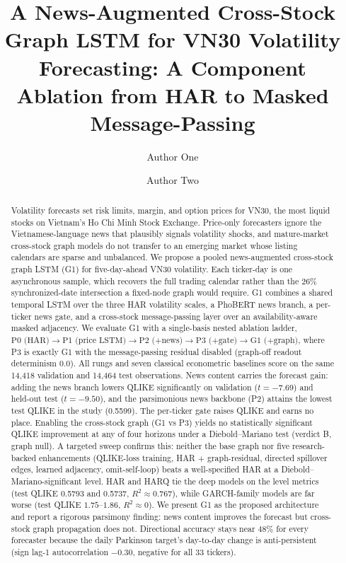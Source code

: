 \documentclass[runningheads]{llncs}
\newcommand{\PtwoTestQ}{0.5599}  %
\newcommand{\HARtestQ}{0.5793}   %
\newcommand{\HARQtestQ}{0.5737}  %
\newcommand{\newsValT}{-7.69}
\newcommand{\newsTestT}{-9.50}
\newcommand{\nval}{14{,}418}
\newcommand{\ntest}{14{,}464}
\newcommand{\ntick}{33}
\begin{document}
%
\title{A News-Augmented Cross-Stock Graph LSTM for VN30 Volatility Forecasting: A Component Ablation from HAR to Masked Message-Passing}
%
%
\author{Author One \and Author Two}
%
%
\maketitle
%
\begin{abstract}
Volatility forecasts set risk limits, margin, and option prices for VN30, the most liquid stocks on
Vietnam's Ho Chi Minh Stock Exchange. Price-only forecasters ignore the Vietnamese-language news that
plausibly signals volatility shocks, and mature-market cross-stock graph models do not transfer to an
emerging market whose listing calendars are sparse and unbalanced. We propose a pooled news-augmented
cross-stock graph LSTM (G1) for five-day-ahead VN30 volatility. Each ticker-day is one asynchronous
sample, which recovers the full trading calendar rather than the 26\% synchronized-date intersection a
fixed-node graph would require. G1 combines a shared temporal LSTM over the three HAR volatility scales,
a PhoBERT news branch, a per-ticker news gate, and a cross-stock message-passing layer over an
availability-aware masked adjacency. We evaluate G1 with a single-basis nested ablation ladder,
$\text{P0 (HAR)}\to\text{P1 (price LSTM)}\to\text{P2 (+news)}\to\text{P3 (+gate)}\to\text{G1 (+graph)}$,
where P3 is exactly G1 with the message-passing residual disabled (graph-off readout determinism $0.0$).
All rungs and seven classical econometric baselines score on the same \nval{} validation and \ntest{}
test observations. News content carries the forecast gain: adding the news branch lowers QLIKE
significantly on validation ($t=\newsValT$) and held-out test ($t=\newsTestT$), and the parsimonious
news backbone (P2) attains the lowest test QLIKE in the study (\PtwoTestQ). The per-ticker gate raises
QLIKE and earns no place. Enabling the cross-stock graph (G1 vs P3) yields no statistically significant
QLIKE improvement at any of four horizons under a Diebold--Mariano test (verdict B, graph null). A
targeted sweep confirms this: neither the base graph nor five research-backed enhancements (QLIKE-loss
training, HAR $+$ graph-residual, directed spillover edges, learned adjacency, omit-self-loop) beats a
well-specified HAR at a Diebold--Mariano-significant level. HAR and
HARQ tie the deep models on the level metrics (test QLIKE \HARtestQ{} and \HARQtestQ, $R^2\approx0.767$),
while GARCH-family models are far worse (test QLIKE $1.75$--$1.86$, $R^2\approx0$). We present G1 as the
proposed architecture and report a rigorous parsimony finding: news content improves the forecast but
cross-stock graph propagation does not. Directional accuracy stays near $48\%$ for every forecaster
because the daily Parkinson target's day-to-day change is anti-persistent (sign lag-1 autocorrelation
$-0.30$, negative for all \ntick{} tickers).


\end{abstract}
\end{document}

